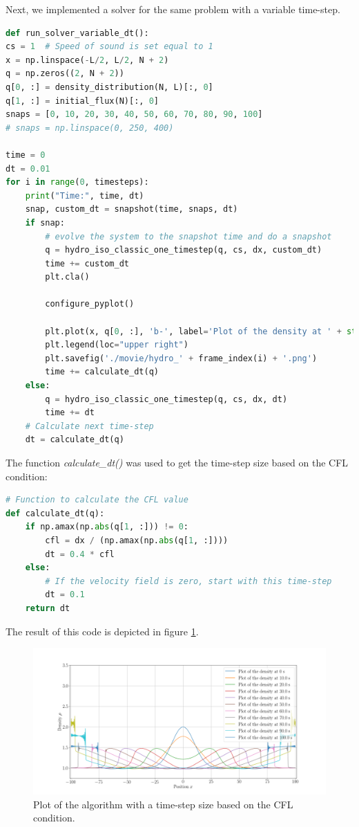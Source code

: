 \documentclass{scrartcl}
\begin{document}
Next, we implemented a solver for the same problem with a variable time-step.
\begin{lstlisting}[title=Function that runs the simple solver with a self-adjusting time-step.,  language=Python, frame=single]
def run_solver_variable_dt():
cs = 1  # Speed of sound is set equal to 1
x = np.linspace(-L/2, L/2, N + 2)
q = np.zeros((2, N + 2))
q[0, :] = density_distribution(N, L)[:, 0]
q[1, :] = initial_flux(N)[:, 0]
snaps = [0, 10, 20, 30, 40, 50, 60, 70, 80, 90, 100]
# snaps = np.linspace(0, 250, 400)

time = 0
dt = 0.01
for i in range(0, timesteps):
	print("Time:", time, dt)
	snap, custom_dt = snapshot(time, snaps, dt)
	if snap:
		# evolve the system to the snapshot time and do a snapshot
		q = hydro_iso_classic_one_timestep(q, cs, dx, custom_dt)
		time += custom_dt
		plt.cla()
	
		configure_pyplot()
	
		plt.plot(x, q[0, :], 'b-', label='Plot of the density at ' + str(time)[0:5] + ' s')
		plt.legend(loc="upper right")
		plt.savefig('./movie/hydro_' + frame_index(i) + '.png')
		time += calculate_dt(q)
	else:
		q = hydro_iso_classic_one_timestep(q, cs, dx, dt)
		time += dt
	# Calculate next time-step
	dt = calculate_dt(q)
\end{lstlisting}
The function \textit{calculate\_dt()} was used to get the time-step size based on the CFL condition:
\begin{lstlisting}[title=Function that runs the simple solver with a self-adjusting time-step.,  language=Python, frame=single]
# Function to calculate the CFL value
def calculate_dt(q):
	if np.amax(np.abs(q[1, :])) != 0:
		cfl = dx / (np.amax(np.abs(q[1, :])))
		dt = 0.4 * cfl
	else:
		# If the velocity field is zero, start with this time-step
		dt = 0.1
	return dt
\end{lstlisting}

The result of this code is depicted in figure \ref{fig:ex1variable}.

\begin{figure}[H]
	\centering
	\includegraphics[width=1\linewidth]{Plots/Ex1_variable}
	\caption{Plot of the algorithm with a time-step size based on the CFL condition.}
	\label{fig:ex1variable}
\end{figure}
\end{document}
